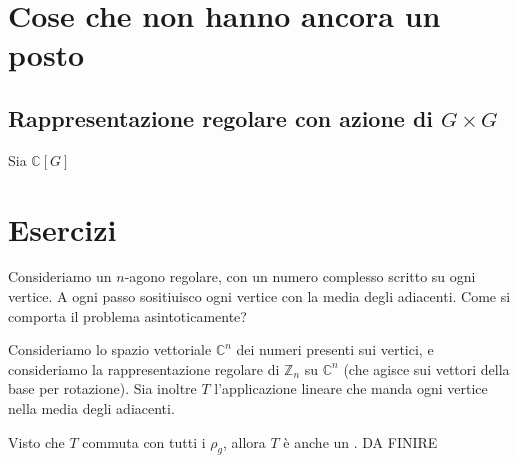\documentclass[a4paper,10pt,oneside]{math_article}
\newcommand{\Cyc}{\mathbb Z}
\begin{document}
 
  \section{Cose che non hanno ancora un posto}
   \subsection{Rappresentazione regolare con azione di $G\times G$}
   Sia $\mathbb C[G]$ 
  \section{Esercizi}
  \begin{myex}
   Consideriamo un $n$-agono regolare, con un numero complesso scritto su ogni vertice. A ogni passo sositiuisco ogni vertice con la media degli adiacenti. Come si comporta il problema asintoticamente?
   
   Consideriamo lo spazio vettoriale $\mathbb C^n$ dei numeri presenti sui vertici, e consideriamo la rappresentazione regolare di $\Cyc_n$ su $\mathbb C^n$ (che agisce sui vettori della base per rotazione). Sia inoltre $T$ l'applicazione lineare che manda ogni vertice nella media degli adiacenti.
   
   Visto che $T$ commuta con tutti i $\rho_g$, allora $T$ è anche un . DA FINIRE
  \end{myex}
\end{document}
